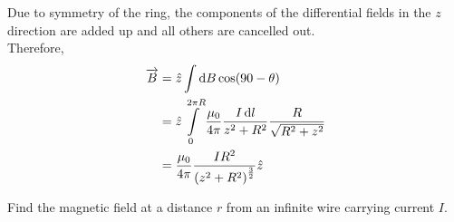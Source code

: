 \documentclass[fleqn, a4paper, 12pt, twoside]{article}
\theoremstyle{definition}
\theoremstyle{theorem}
\begin{document}
\begin{solution}
	\begin{figure}[H]
	\end{figure}
	Due to symmetry of the ring, the components of the differential fields in the $z$ direction are added up and all others are cancelled out.\\
	Therefore,
	\begin{align*}
		\overrightarrow{B} & = \hat{z} \int \dif B \cos(90 - \theta)                                                                       \\
                                   & = \hat{z} \int\limits_{0}^{2 \pi R} \frac{\mu_0}{4 \pi} \frac{I \dif l}{z^2 + R^2} \frac{R}{\sqrt{R^2 + z^2}} \\
                                   & = \frac{\mu_0}{4 \pi} \frac{I R^2}{\left( z^2 + R^2 \right)^{\frac{3}{2}}} \hat{z}
	\end{align*}
\end{solution}

\begin{question}
	Find the magnetic field at a distance $r$ from an infinite wire carrying current $I$.
\end{question}
\end{document}
